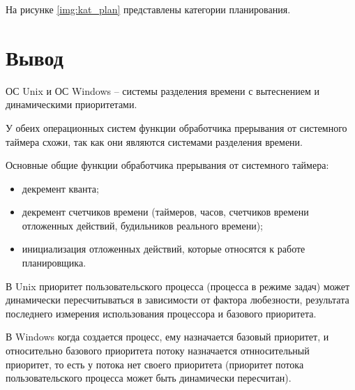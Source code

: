 На рисунке \ref{img:kat_plan} представлены категории планирования.




\chapter*{Вывод}

ОС Unix и ОС Windows -- системы разделения времени с вытеснением и динамическими приоритетами.

У обеих операционных систем функции обработчика прерывания от системного таймера схожи, так как они являются системами разделения времени.

Основные общие функции обработчика прерывания от системного таймера:

\begin{itemize}
    \item декремент кванта;
    \item декремент счетчиков времени (таймеров, часов, счетчиков времени отложенных действий, будильников реального времени);
    \item инициализация отложенных действий, которые относятся к работе планировщика.
\end{itemize}


В Unix приоритет пользовательского процесса (процесса в режиме задач) может динамически пересчитываться в зависимости от фактора любезности, результата последнего измерения использования процессора и базового приоритета.

В Windows когда создается процесс, ему назначается базовый приоритет, и относительно базового приоритета потоку назначается отнносительный приоритет, то есть у потока нет своего приоритета (приоритет потока пользовательского процесса может быть динамически пересчитан).


